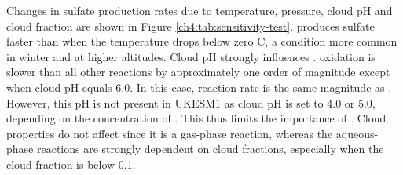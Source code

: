 Changes in sulfate production rates due to temperature, pressure, cloud pH and cloud fraction are shown in Figure \ref{ch4:tab:sensitivity-test}.  produces sulfate faster than  when the temperature drops below zero \textdegree C, a condition more common in winter and at higher altitudes. Cloud pH strongly influences .  oxidation is slower than all other reactions by approximately one order of magnitude except when cloud pH equals 6.0. In this case,  reaction rate is the same magnitude as . However, this pH is not present in UKESM1 as cloud pH is set to 4.0 or 5.0, depending on the concentration of . This thus limits the importance of . Cloud properties do not affect  since it is a gas-phase reaction, whereas the aqueous-phase reactions are strongly dependent on cloud fractions, especially when the cloud fraction is below 0.1. 


